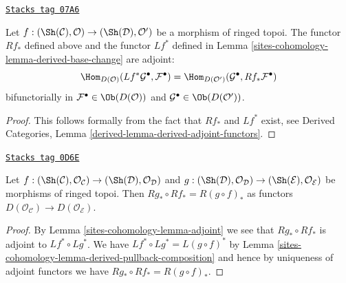 \begin{lemma}[Adjoint]
\label{sites-cohomology-lemma-adjoint}
\href{https://stacks.math.columbia.edu/tag/07A6}{\texttt{Stacks tag 07A6}}

Let $f : (\Sh(\mathcal{C}), \mathcal{O}) \to (\Sh(\mathcal{D}), \mathcal{O}')$
be a morphism of ringed topoi.
The functor $Rf_*$ defined above and
the functor $Lf^*$ defined in
Lemma \ref{sites-cohomology-lemma-derived-base-change} are adjoint:
$$
\Hom_{D(\mathcal{O})}(Lf^*\mathcal{G}^\bullet, \mathcal{F}^\bullet)
=
\Hom_{D(\mathcal{O}')}(\mathcal{G}^\bullet, Rf_*\mathcal{F}^\bullet)
$$
bifunctorially in $\mathcal{F}^\bullet \in \Ob(D(\mathcal{O}))$ and
$\mathcal{G}^\bullet \in \Ob(D(\mathcal{O}'))$.
\end{lemma}

\begin{proof}
This follows formally from the fact that $Rf_*$ and $Lf^*$ exist, see
Derived Categories, Lemma \ref{derived-lemma-derived-adjoint-functors}.
\end{proof}

\begin{lemma}
\label{sites-cohomology-lemma-derived-pushforward-composition}
\href{https://stacks.math.columbia.edu/tag/0D6E}{\texttt{Stacks tag 0D6E}}

Let
$f : (\Sh(\mathcal{C}), \mathcal{O}_\mathcal{C}) \to
(\Sh(\mathcal{D}), \mathcal{O}_\mathcal{D})$
and
$g : (\Sh(\mathcal{D}), \mathcal{O}_\mathcal{D}) \to
(\Sh(\mathcal{E}), \mathcal{O}_\mathcal{E})$
be morphisms of ringed topoi.
Then $Rg_* \circ Rf_* = R(g \circ f)_*$ as functors
$D(\mathcal{O}_\mathcal{C}) \to D(\mathcal{O}_\mathcal{E})$.
\end{lemma}

\begin{proof}
By Lemma \ref{sites-cohomology-lemma-adjoint} we see that $Rg_* \circ Rf_*$
is adjoint to $Lf^* \circ Lg^*$. We have
$Lf^* \circ Lg^* = L(g \circ f)^*$ by
Lemma \ref{sites-cohomology-lemma-derived-pullback-composition}
and hence by
uniqueness of adjoint functors we have $Rg_* \circ Rf_* = R(g \circ f)_*$.
\end{proof}

